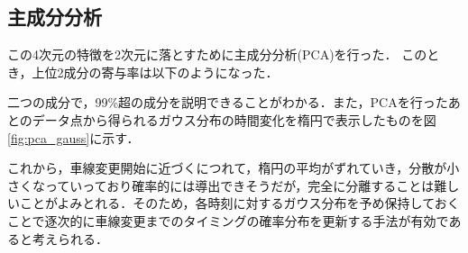 \subsection{主成分分析}
この4次元の特徴を2次元に落とすために主成分分析(PCA)を行った．
このとき，上位2成分の寄与率は以下のようになった．

二つの成分で，99\%超の成分を説明できることがわかる．また，PCAを行ったあとのデータ点から得られるガウス分布の時間変化を楕円で表示したものを図\ref{fig:pca_gauss}に示す．

これから，車線変更開始に近づくにつれて，楕円の平均がずれていき，分散が小さくなっていっており確率的には導出できそうだが，完全に分離することは難しいことがよみとれる．そのため，各時刻に対するガウス分布を予め保持しておくことで逐次的に車線変更までのタイミングの確率分布を更新する手法が有効であると考えられる．
